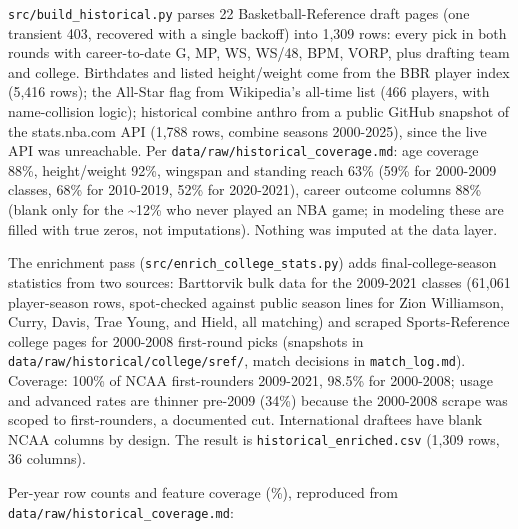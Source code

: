 \documentclass[
  10pt,
]{article}
\begin{document}
\texttt{src/build\_historical.py} parses 22 Basketball-Reference draft pages
(one transient 403, recovered with a single backoff) into 1,309 rows: every pick
in both rounds with career-to-date G, MP, WS, WS/48, BPM, VORP, plus drafting
team and college. Birthdates and listed height/weight come from the BBR player
index (5,416 rows); the All-Star flag from Wikipedia's all-time list (466
players, with name-collision logic); historical combine anthro from a public
GitHub snapshot of the stats.nba.com API (1,788 rows, combine seasons
2000-2025), since the live API was unreachable. Per
\texttt{data/raw/historical\_coverage.md}: age coverage 88\%, height/weight
92\%, wingspan and standing reach 63\% (59\% for 2000-2009 classes, 68\% for
2010-2019, 52\% for 2020-2021), career outcome columns 88\% (blank only for the
\textasciitilde12\% who never played an NBA game; in modeling these are filled
with true zeros, not imputations). Nothing was imputed at the data layer.

The enrichment pass (\texttt{src/enrich\_college\_stats.py}) adds
final-college-season statistics from two sources: Barttorvik bulk data for the
2009-2021 classes (61,061 player-season rows, spot-checked against public season
lines for Zion Williamson, Curry, Davis, Trae Young, and Hield, all matching)
and scraped Sports-Reference college pages for 2000-2008 first-round picks
(snapshots in \texttt{data/raw/historical/college/sref/}, match decisions in
\texttt{match\_log.md}). Coverage: 100\% of NCAA first-rounders 2009-2021,
98.5\% for 2000-2008; usage and advanced rates are thinner pre-2009 (34\%)
because the 2000-2008 scrape was scoped to first-rounders, a documented cut.
International draftees have blank NCAA columns by design. The result is
\texttt{historical\_enriched.csv} (1,309 rows, 36 columns).

Per-year row counts and feature coverage (\%), reproduced from
\texttt{data/raw/historical\_coverage.md}:
\end{document}
